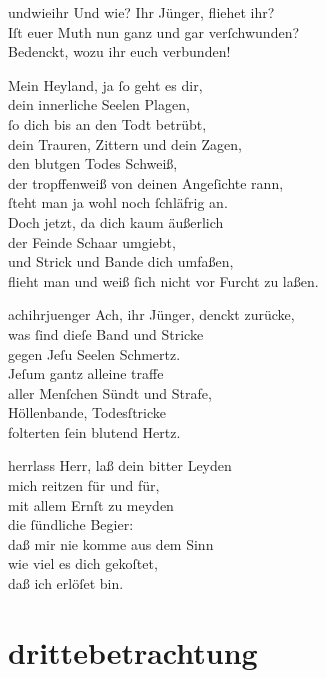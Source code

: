 \documentclass[abbrwidth=6em,tocstyle=ref-genre,shorttitlesize=50]{ees}
\begin{document}
{\begin{movement}{undwieihr}
  \voice[Tenore]
  Und wie? Ihr Jünger, fliehet ihr?\\
  Iſt euer Muth nun ganz und gar verſchwunden?\\
  Bedenckt, wozu ihr euch verbunden!

  \voice[Basſo]
  Mein Heyland, ja ſo geht es dir,\\
  dein innerliche Seelen Plagen,\\
  ſo dich bis an den Todt betrübt,\\
  dein Trauren, Zittern und dein Zagen,\\
  den blutgen Todes Schweiß,\\
  der tropffenweiß von deinen Angeſichte rann,\\
  ſteht man ja wohl noch ſchläfrig an.\\
  Doch jetzt, da dich kaum äußerlich\\
  der Feinde Schaar umgiebt,\\
  und Strick und Bande dich umfaßen,\\
  flieht man und weiß ſich nicht vor Furcht zu laßen.
\end{movement}

\begin{movement}{achihrjuenger}
  Ach, ihr Jünger, denckt zurücke,\\
  was ſind dieſe Band und Stricke\\
  gegen Jeſu Seelen Schmertz.\\
  Jeſum gantz alleine traffe\\
  aller Menſchen Sündt und Strafe,\\
  Höllenbande, Todesſtricke\\
  folterten ſein blutend Hertz.
\end{movement}

\begin{movement}{herrlass}
  \voice[Coro]
  Herr, laß dein bitter Leyden\\
  mich reitzen für und für,\\
  mit allem Ernſt zu meyden\\
  die ſündliche Begier:\\
  daß mir nie komme aus dem Sinn\\
  wie viel es dich gekoſtet,\\
  daß ich erlöſet bin.
\end{movement}

\part{drittebetrachtung}

}
\end{document}
